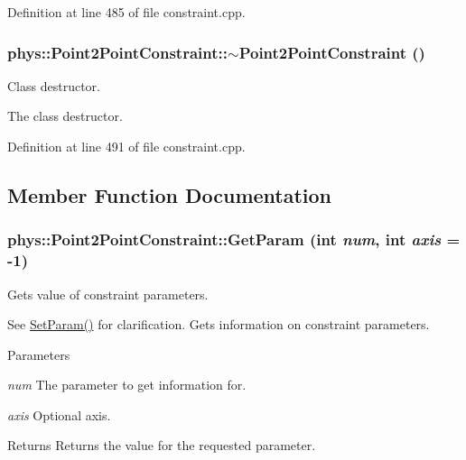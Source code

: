 Definition at line 485 of file constraint.cpp.

\hypertarget{classphys_1_1Point2PointConstraint_aa735ad83877ff57a8a49269a87a46253}{
\subsubsection[{$\sim$Point2PointConstraint}]{\setlength{\rightskip}{0pt plus 5cm}phys::Point2PointConstraint::$\sim$Point2PointConstraint ()}}
\label{da/dfb/classphys_1_1Point2PointConstraint_aa735ad83877ff57a8a49269a87a46253}


Class destructor. 

The class destructor. 

Definition at line 491 of file constraint.cpp.



\subsection{Member Function Documentation}
\hypertarget{classphys_1_1Point2PointConstraint_a0f58e2b57a463fe6fe44e7b3192fc3b7}{
\subsubsection[{GetParam}]{ phys::Point2PointConstraint::GetParam (int {\em num}, \/  int {\em axis} = {\ttfamily -\/1})}}
\label{da/dfb/classphys_1_1Point2PointConstraint_a0f58e2b57a463fe6fe44e7b3192fc3b7}


Gets value of constraint parameters. 

See \hyperlink{classphys_1_1Point2PointConstraint_ad6f28464773121658e54e8bde2a14704}{SetParam()} for clarification. Gets information on constraint parameters. 
\begin{DoxyParams}{Parameters}
\item[{\em num}]The parameter to get information for. \item[{\em axis}]Optional axis. \end{DoxyParams}
\begin{DoxyReturn}{Returns}
Returns the value for the requested parameter. 
\end{DoxyReturn}


